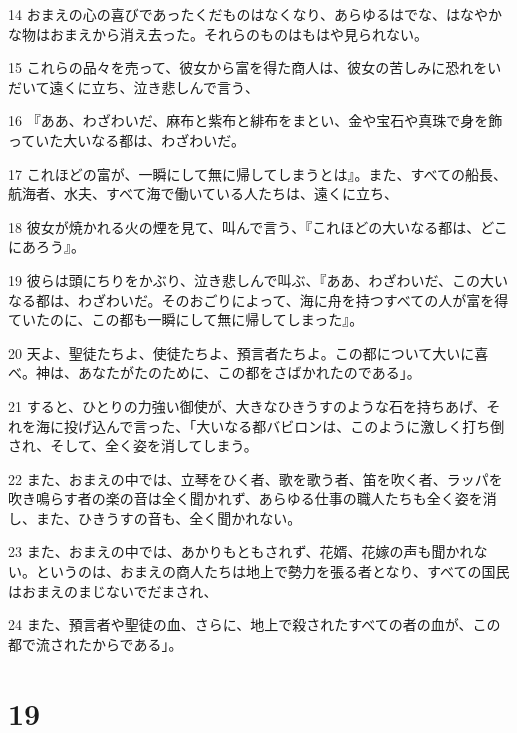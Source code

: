 \par 14 おまえの心の喜びであったくだものはなくなり、あらゆるはでな、はなやかな物はおまえから消え去った。それらのものはもはや見られない。
\par 15 これらの品々を売って、彼女から富を得た商人は、彼女の苦しみに恐れをいだいて遠くに立ち、泣き悲しんで言う、
\par 16 『ああ、わざわいだ、麻布と紫布と緋布をまとい、金や宝石や真珠で身を飾っていた大いなる都は、わざわいだ。
\par 17 これほどの富が、一瞬にして無に帰してしまうとは』。また、すべての船長、航海者、水夫、すべて海で働いている人たちは、遠くに立ち、
\par 18 彼女が焼かれる火の煙を見て、叫んで言う、『これほどの大いなる都は、どこにあろう』。
\par 19 彼らは頭にちりをかぶり、泣き悲しんで叫ぶ、『ああ、わざわいだ、この大いなる都は、わざわいだ。そのおごりによって、海に舟を持つすべての人が富を得ていたのに、この都も一瞬にして無に帰してしまった』。
\par 20 天よ、聖徒たちよ、使徒たちよ、預言者たちよ。この都について大いに喜べ。神は、あなたがたのために、この都をさばかれたのである」。
\par 21 すると、ひとりの力強い御使が、大きなひきうすのような石を持ちあげ、それを海に投げ込んで言った、「大いなる都バビロンは、このように激しく打ち倒され、そして、全く姿を消してしまう。
\par 22 また、おまえの中では、立琴をひく者、歌を歌う者、笛を吹く者、ラッパを吹き鳴らす者の楽の音は全く聞かれず、あらゆる仕事の職人たちも全く姿を消し、また、ひきうすの音も、全く聞かれない。
\par 23 また、おまえの中では、あかりもともされず、花婿、花嫁の声も聞かれない。というのは、おまえの商人たちは地上で勢力を張る者となり、すべての国民はおまえのまじないでだまされ、
\par 24 また、預言者や聖徒の血、さらに、地上で殺されたすべての者の血が、この都で流されたからである」。

\chapter{19}

